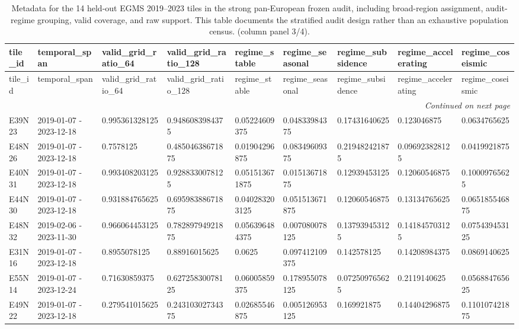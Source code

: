 \begin{landscape}
\scriptsize
\setlength{\LTleft}{0pt}
\setlength{\LTright}{0pt}
\begin{longtable}{lllllllll}
\caption{Metadata for the 14 held-out EGMS 2019--2023 tiles in the strong pan-European frozen audit, including broad-region assignment, audit-regime grouping, valid coverage, and raw support. This table documents the stratified audit design rather than an exhaustive population census. (column panel 3/4).}\label{tab:e7_strong_tile_metadata_part3}\\
\toprule
tile\_id & temporal\_span & valid\_grid\_ratio\_64 & valid\_grid\_ratio\_128 & regime\_stable & regime\_seasonal & regime\_subsidence & regime\_accelerating & regime\_coseismic \\
\midrule
\endfirsthead
\toprule
tile\_id & temporal\_span & valid\_grid\_ratio\_64 & valid\_grid\_ratio\_128 & regime\_stable & regime\_seasonal & regime\_subsidence & regime\_accelerating & regime\_coseismic \\
\midrule
\endhead
\midrule
\multicolumn{9}{r}{\textit{Continued on next page}} \\
\endfoot
\bottomrule
\endlastfoot
E39N23 & 2019-01-07 - 2023-12-18 & 0.995361328125 & 0.9486083984375 & 0.05224609375 & 0.04833984375 & 0.17431640625 & 0.123046875 & 0.0634765625 \\
E48N26 & 2019-01-07 - 2023-12-18 & 0.7578125 & 0.48504638671875 & 0.01904296875 & 0.08349609375 & 0.219482421875 & 0.096923828125 & 0.0419921875 \\
E40N31 & 2019-01-07 - 2023-12-18 & 0.993408203125 & 0.9288330078125 & 0.051513671875 & 0.01513671875 & 0.12939453125 & 0.12060546875 & 0.10009765625 \\
E44N30 & 2019-01-07 - 2023-12-18 & 0.931884765625 & 0.69598388671875 & 0.040283203125 & 0.051513671875 & 0.12060546875 & 0.13134765625 & 0.065185546875 \\
E48N32 & 2019-02-06 - 2023-11-30 & 0.966064453125 & 0.78289794921875 & 0.056396484375 & 0.007080078125 & 0.137939453125 & 0.141845703125 & 0.075439453125 \\
E31N16 & 2019-01-07 - 2023-12-18 & 0.8955078125 & 0.88916015625 & 0.0625 & 0.097412109375 & 0.142578125 & 0.14208984375 & 0.0869140625 \\
E55N14 & 2019-01-07 - 2023-12-24 & 0.71630859375 & 0.62725830078125 & 0.06005859375 & 0.178955078125 & 0.072509765625 & 0.2119140625 & 0.056884765625 \\
E49N22 & 2019-01-07 - 2023-12-18 & 0.279541015625 & 0.24310302734375 & 0.02685546875 & 0.005126953125 & 0.169921875 & 0.14404296875 & 0.110107421875 \\

\end{longtable}
\end{landscape}
